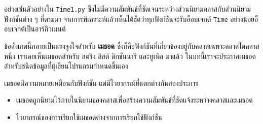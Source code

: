 อย่างเช่นตัวอย่างใน {\tt Time1.py} ซึ่งไม่มีความสัมพันธ์ที่ชัดเจนระหว่างส่วนนิยามคลาสกับส่วนนิยามฟังก์ชันต่าง ๆ ที่ตามมา 
จากการพิเคราะห์แล้วเห็นได้ชัดว่าทุกฟังก์ชันจะรับอ็อบเจกต์ {\tt Time} อย่างน้อยอ็อบเจกต์เป็นอาร์กิวเมนต์ 


ข้อสังเกตนี้กลายเป็นแรงจูงใจสำหรับ {\bf เมธอด} ซึ่งก็คือฟังก์ชันที่เกี่ยวข้องอยู่กับคลาสเฉพาะคลาสใดคลาสหนึ่ง 
เราเคยเห็นเมธอดสำหรับ สตริง ลิสต์ ดิกชันนารี และทูเพิล มาแล้ว ในบทนี้เราจะประกาศเมธอดสำหรับชนิดข้อมูลที่ผู้เขียนโปรแกรมกำหนดขึ้นเอง

เมธอดมีความหมายเหมือนกับฟังก์ชัน แต่มีไวยากรณ์ที่แตกต่างกันสองประการ

\begin{itemize}


\item เมธอดถูกนิยามไว้ภายในนิยามของคลาสเพื่อสร้างความสัมพันธ์ที่ชัดแจ้งระหว่างคลาสและเมธอด


\item  ไวยากรณ์ของการเรียกใช้เมธอดต่างจากการเรียกใช้ฟังก์ชัน

\end{itemize}


